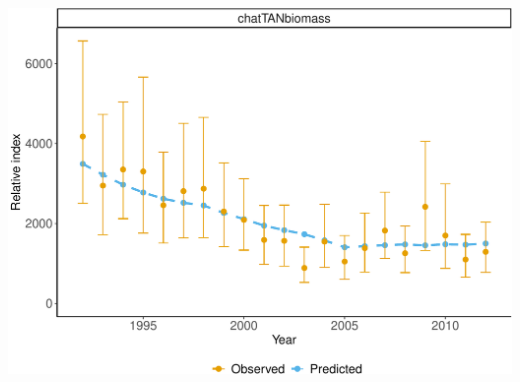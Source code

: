 \documentclass[
]{book}
\begin{document}
\includegraphics{_main_files/figure-latex/plot_relative_index-1.pdf}
\end{document}
